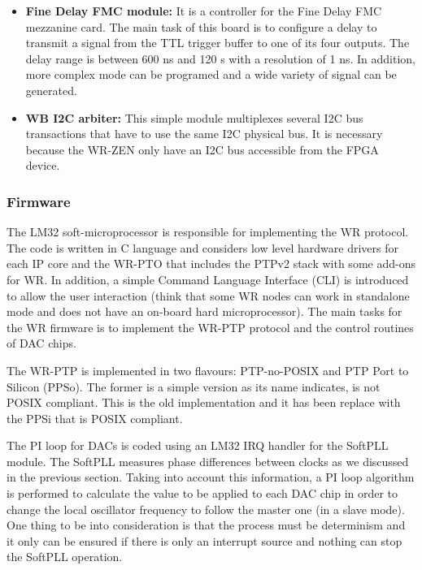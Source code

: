 \begin{itemize}
{	%
	}
	\item{\textbf{Fine Delay FMC module:} It is a controller for the Fine Delay FMC mezzanine card. The main task of this board is to configure a delay to transmit a signal from the TTL trigger buffer to one of its four outputs. The delay range is between 600 ns and 120 s with a resolution of 1 ns. In addition, more complex mode can be programed and a wide variety of signal can be generated.}
	\item{\textbf{WB I2C arbiter:} This simple module multiplexes several I2C bus transactions that have to use the same I2C physical bus. It is necessary because the WR-ZEN only have an I2C bus accessible from the FPGA device.}
\end{itemize}

\subsubsection{Firmware}

The LM32 soft-microprocessor is responsible for implementing the WR protocol. The code is written in C language and considers low level hardware drivers for each IP core and the WR-PTO that includes the PTPv2 stack with some add-ons for WR. In addition, a simple Command Language Interface (CLI) is introduced to allow the user interaction (think that some WR nodes can work in standalone mode and does not have an on-board hard microprocessor). The main tasks for the WR firmware is to implement the WR-PTP protocol and the control routines of DAC chips. 

The WR-PTP is implemented in two flavours: PTP-no-POSIX and PTP Port to Silicon (PPSo). The former is a simple version as its name indicates, is not POSIX compliant. This is the old implementation and it has been replace with the PPSi that is POSIX compliant.

The PI loop for DACs is coded using an LM32 IRQ handler for the SoftPLL module. The SoftPLL measures phase differences between clocks as we discussed in the previous section. Taking into account this information, a PI loop algorithm is performed to calculate the value to be applied to each DAC chip in order to change the local oscillator frequency to follow the master one (in a slave mode). One thing to be into consideration is that the process must be determinism and it only can be ensured if there is only an interrupt source and nothing can stop the SoftPLL operation.

